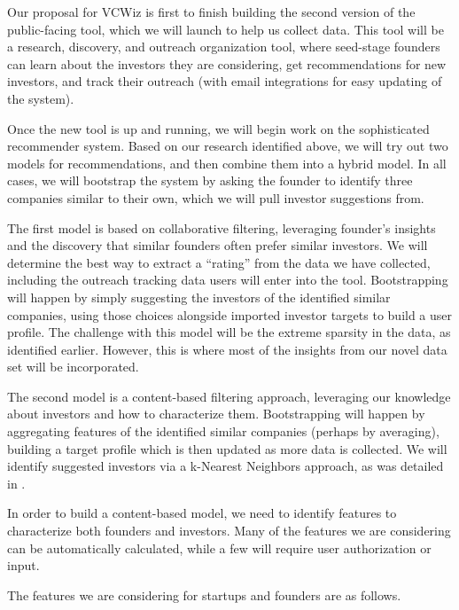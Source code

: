 Our proposal for VCWiz is first to finish building the second version of the public-facing tool, which we will launch to help us collect data. This tool will be a research, discovery, and outreach organization tool, where seed-stage founders can learn about the investors they are considering, get recommendations for new investors, and track their outreach (with email integrations for easy updating of the system).

Once the new tool is up and running, we will begin work on the sophisticated recommender system. Based on our research identified above, we will try out two models for recommendations, and then combine them into a hybrid model. In all cases, we will bootstrap the system by asking the founder to identify three companies similar to their own, which we will pull investor suggestions from.

The first model is based on collaborative filtering, leveraging founder's insights and the discovery that similar founders often prefer similar investors. We will determine the best way to extract a ``rating'' from the data we have collected, including the outreach tracking data users will enter into the tool. Bootstrapping will happen by simply suggesting the investors of the identified similar companies, using those choices alongside imported investor targets to build a user profile. The challenge with this model will be the extreme sparsity in the data, as identified earlier. However, this is where most of the insights from our novel data set will be incorporated.

The second model is a content-based filtering approach, leveraging our knowledge about investors and how to characterize them. Bootstrapping will happen by aggregating features of the identified similar companies (perhaps by averaging), building a target profile which is then updated as more data is collected. We will identify suggested investors via a k-Nearest Neighbors approach, as was detailed in \cite{stone2014computational}.

In order to build a content-based model, we need to identify features to characterize both founders and investors. Many of the features we are considering can be automatically calculated, while a few will require user authorization or input.

The features we are considering for startups and founders are as follows.

